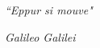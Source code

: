 \documentclass{beamer}
\begin{document}
\begin{frame}
\begin{center}
\Huge 
\textit{``Eppur si mouve"}
\end{center}
\begin{flushright}
\small
\textit{Galileo Galilei}
\end{flushright}
\end{frame}





\end{document}
